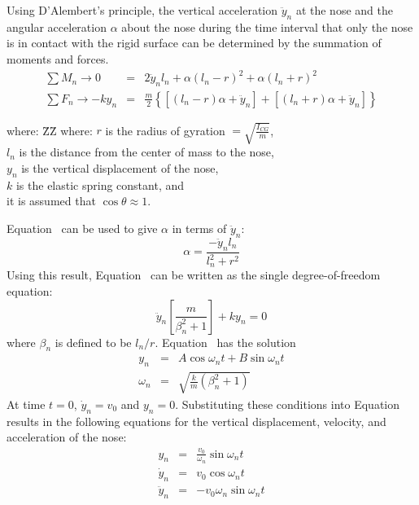 Using D'Alembert's principle, the vertical acceleration $\ddot y_n$ at the
nose and the angular acceleration $\alpha$ about the nose during
the time interval that only the nose is in contact with the rigid
surface can be determined by the summation of moments and forces. 
\begin{eqnarray}
\sum M_n\rightarrow 0  & = & 2 \ddot y_n l_n +\alpha(l_n-r)^2
     +\alpha(l_n+r)^2\label{e1} \\ 
\sum F_n\rightarrow -ky_n & = & \frac{m}{2}\left\{\left[(l_n-r)\alpha 
     +\ddot y_n \right] +\left[(l_n+r)\alpha+\ddot y_n\right]\right\}\label{e2}
\end{eqnarray}
\begin{tabbing}
where: \=ZZ\= \kill
where: \>$r  $\> is the radius of gyration ${}=\sqrt{\frac{I_{CG}}{m}}$,\\
       \>$l_n$\> is the distance from the center of mass to the nose,\\ 
       \>$y_n$\> is the vertical displacement of the nose,\\
       \>$k  $\> is the elastic spring constant, and\\
       \>     \> it is assumed that $\cos\theta\approx 1$.
\end{tabbing}
Equation~ can be used to give $\alpha$ in terms of $\ddot y_n$:
\begin{equation}
\alpha = \frac{-\ddot y_n l_n}{l_n^2 + r^2}\label{eq:alpha}
\end{equation}
Using this result, Equation~ can be written as the single
degree-of-freedom equation: 
\begin{equation}
\ddot y_n\left[\frac{m}{\beta_n^2+1}\right] + ky_n = 0\label{eq:diff}
\end{equation}
where $\beta_n$ is defined to be $l_n/r$.  Equation~ has the
solution
\begin{eqnarray}
     y_n & = & A\cos\omega_n t + B\sin\omega_n t\label{eq:acbs}\\
\omega_n & = & \sqrt{\frac{k}{m}\left(\beta_n^2+1\right)}
\end{eqnarray}
At time $t=0$, $\dot y_n = v_0$ and $y_n = 0$.  Substituting these 
conditions into Equation~ results in the following equations
for the vertical displacement, velocity, and acceleration of the nose: 
\begin{eqnarray}
      y_n & = &  \frac{v_0}{\omega_n}\sin\omega_n t\\
 \dot y_n & = &  v_0\cos\omega_n t\label{eq:vl}\\
\ddot y_n & = & -v_0\omega_n\sin\omega_n t\label{eq:ayl}
\end{eqnarray}
